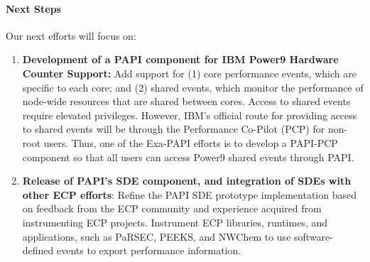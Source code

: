 \paragraph{Next Steps}

Our next efforts will focus on:
\begin{enumerate}
\item \textbf{Development of a PAPI component for IBM Power9 Hardware Counter
	Support:} Add support for (1) core performance events, which are specific
		to each core; and (2) shared events, which monitor the performance of
		node-wide resources that are shared between cores. Access to shared
		events require elevated privileges. However, IBM's official route for providing
		access to shared events will be through the
		Performance Co-Pilot (PCP) for non-root users. Thus, one of the
		Exa-PAPI efforts is to develop a PAPI-PCP component so that all users
		can access Power9 shared events through PAPI.
%
\item \textbf{Release of PAPI's SDE component, and integration of SDEs with other ECP efforts}: 
		Refine the PAPI SDE prototype implementation based on
		feedback from the ECP community and experience acquired from
		instrumenting ECP projects. Instrument ECP libraries, runtimes, and
		applications, such as PaRSEC, PEEKS, and NWChem to use software-defined
		events to export performance information.
\end{enumerate}
